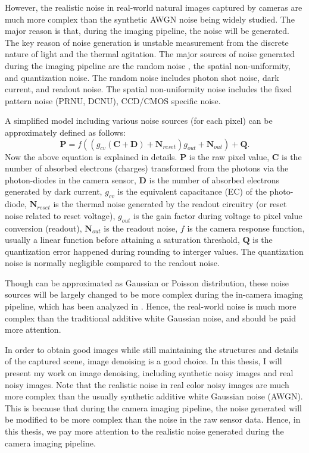 However, the realistic noise in real-world natural images captured by cameras are much more complex than the synthetic AWGN noise being widely studied. The major reason is that, during the imaging pipeline, the noise will be generated. The key reason of noise generation is unstable measurement from the discrete nature of light and the thermal agitation. The major sources of noise generated during the imaging pipeline are the random noise , the spatial non-uniformity, and quantization noise. The random noise includes photon shot noise, dark current, and readout noise. The spatial non-uniformity noise includes the fixed pattern noise (PRNU, DCNU), CCD/CMOS specific noise. 


A simplified model including various noise sources (for each pixel) can be approximately defined as follows:
\begin{equation}
\bm{P} = f((g_{cv}(\bm{C}+\bm{D})+\bm{N}_{reset})g_{out}+\bm{N}_{out})+\bm{Q}.
\end{equation}
Now the above equation is explained in details. 
$\bm{P}$ is the raw pixel value, 
$\bm{C}$ is the number of absorbed electrons (charges) transformed from the photons via the photon-diodes in the camera sensor,
$\bm{D}$ is the number of absorbed electrons generated by dark current,
$g_{cv}$ is the equivalent capacitance (EC) of the photo-diode,
$\bm{N}_{reset}$ is the thermal noise generated by the readout circuitry (or reset noise related to reset voltage),
$g_{out}$ is the gain factor during voltage to pixel value conversion (readout),
$\bm{N}_{out}$ is the readout noise,
$f$ is the camera response function, usually a linear function before attaining a saturation threshold,
$\bm{Q}$ is the quantization error happened during rounding to interger values. The quantization noise is normally negligible compared to the readout noise.

Though can be approximated as Gaussian or Poisson distribution, these noise sources will be largely changed to be more complex during the in-camera imaging pipeline, which has been analyzed in \cite{crosschannel}. Hence, the real-world noise is much more complex than the traditional additive white Gaussian noise, and should be paid more attention.

In order to obtain good images while still maintaining the structures and details of the captured scene, image denoising is a good choice. In this thesis, I will present my work on image denoising, including synthetic noisy images and real noisy images. Note that the realistic noise in real color noisy images are much more complex than the usually synthetic additive white Gaussian noise (AWGN). This is because that during the camera imaging pipeline, the noise generated will be modified to be more complex than the noise in the raw sensor data. Hence, in this thesis, we pay more attention to the realistic noise generated during the camera imaging pipeline. 


